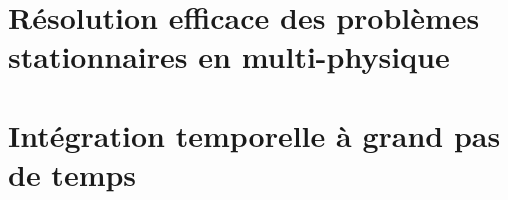 



\makeflyleaf
{}

\tableofcontents
{}



\part{Résolution efficace des problèmes stationnaires en multi-physique}

  

  

  

\part{Intégration temporelle à grand pas de temps}

    

    





